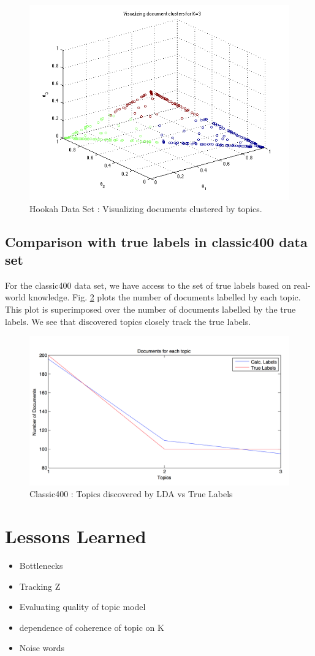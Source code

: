 \documentclass[11pt,a4paper,oneside]{article}
\begin{document}
\begin{figure}[H]
\centering
\includegraphics[width=\columnwidth]{scatter_hookah}
\caption{Hookah Data Set : Visualizing documents clustered by topics.}
\label{fig:scatter_hookah}
\end{figure}

\subsection{Comparison with true labels in classic400 data set}
For the classic400 data set, we have access to the set of true labels based on real-world knowledge. Fig. \ref{fig:truelabels} plots the number of documents labelled by each topic. This plot is superimposed over the number of documents labelled by the true labels. We see that discovered topics closely track the true labels.

\begin{figure}[H]
\centering
\includegraphics[width=\columnwidth]{truelabels}
\caption{Classic400 : Topics discovered by LDA vs True Labels}
\label{fig:truelabels}
\end{figure}

\section{Lessons Learned}
\label{Lessons}
\begin{itemize}
\item Bottlenecks
\item Tracking Z
\item Evaluating quality of topic model
\item dependence of coherence of topic on K
\item Noise words
\end{itemize}



\end{document}
